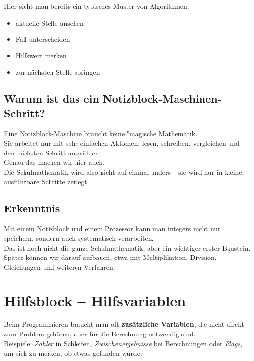 \documentclass{article}
\begin{document}
  Hier sieht man bereits ein typisches Muster von Algorithmen:

          \begin{itemize}
            \item aktuelle Stelle ansehen
            \item Fall unterscheiden
            \item Hilfswert merken
            \item zur nächsten Stelle springen

          \end{itemize}


          \subsection{Warum ist das ein Notizblock-Maschinen-Schritt?}

        
  Eine Notizblock-Maschine braucht keine "magische Mathematik.\\
            Sie arbeitet nur mit sehr einfachen Aktionen: lesen, schreiben, vergleichen und den nächsten Schritt auswählen.\\
            Genau das machen wir hier auch.\\
            Die Schulmathematik wird also nicht auf einmal anders – sie wird nur in kleine, ausführbare Schritte zerlegt.


          \subsection{Erkenntnis}

        
  Mit einem Notizblock und einem Prozessor kann man integers nicht nur speichern, sondern auch systematisch verarbeiten.\\
            Das ist noch nicht die ganze Schulmathematik, aber ein wichtiger erster Baustein.\\
            Später können wir darauf aufbauen, etwa mit Multiplikation, Division, Gleichungen und weiteren Verfahren.
    

    
      
        \section{Hilfsblock – Hilfsvariablen}
        
Beim Programmieren braucht man oft \textbf{zusätzliche Variablen}, die nicht direkt zum Problem gehören, aber für die Berechnung notwendig sind.\\
          Beispiele: \emph{Zähler} in Schleifen, \emph{Zwischenergebnisse} bei Berechnungen oder \emph{Flags}, um sich zu merken, ob etwas gefunden wurde.
\end{document}
